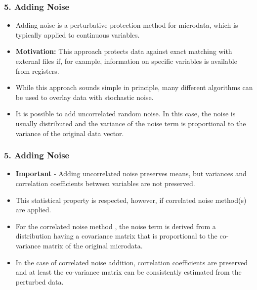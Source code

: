 \documentclass{beamer}
\begin{document}
\begin{frame}
\frametitle{5. Adding Noise}
\begin{itemize}

\item Adding noise is a perturbative protection method for microdata, which is typically
applied to continuous variables. 
\item \textbf{Motivation:} This approach protects data against exact matching with external files if, for example, information on specific variables is available
from registers.

\item While this approach sounds simple in principle, many different algorithms can
be used to overlay data with stochastic noise. 
\item It is possible to add uncorrelated
random noise. In this case, the noise is usually distributed and the variance of
the noise term is proportional to the variance of the original data vector. 
\end{itemize}
\end{frame}
\begin{frame}
	\frametitle{5. Adding Noise}
	\begin{itemize}
		\item \textbf{Important} - Adding
uncorrelated noise preserves means, but variances and correlation coefficients between variables are not preserved.
\item This statistical property is respected, however,
if correlated noise method(s) are applied.

\item For the correlated noise method , the noise term is derived from a
distribution having a covariance matrix that is proportional to the co-variance matrix of the original microdata. 
\item In the case of correlated noise addition, correlation
coefﬁcients are preserved and at least the co-variance matrix can be consistently
estimated from the perturbed data. 
\end{itemize}
\end{frame}
\end{document}
